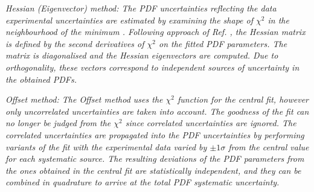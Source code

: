 \begin{description}
\item \it{Hessian (Eigenvector) method:} \rm
The PDF uncertainties reflecting the data experimental uncertainties are estimated by 
examining the shape of $\chi^2$ in the neighbourhood of the minimum \cite{Pumplin:2001ct}.
Following approach of Ref. \cite{Pumplin:2001ct}, the Hessian matrix is defined by the second 
derivatives of $\chi^2$ on the fitted PDF parameters. The matrix is diagonalised and the 
Hessian eigenvectors are computed. 
Due to orthogonality, these vectors correspond to independent sources of
uncertainty in the obtained PDFs.
\\
%

\item \it{Offset  method:} \rm
The Offset method \cite{Botje:2001fx} uses
%
the $\chi^2$ function for the central fit, however only
uncorrelated uncertainties are taken into account. 
The goodness of the fit can no longer be judged from the $\chi^2$ since correlated uncertainties are ignored. 
The correlated uncertainties are propagated into the PDF uncertainties by performing variants 
of the fit with the experimental data varied by $\pm 1 \sigma$ from the central value  
for each systematic source.
The resulting deviations of the PDF parameters from the ones obtained in the central 
fit are statistically independent, and they can be combined in quadrature to arrive at the total 
PDF systematic uncertainty.
%


\end{description}
